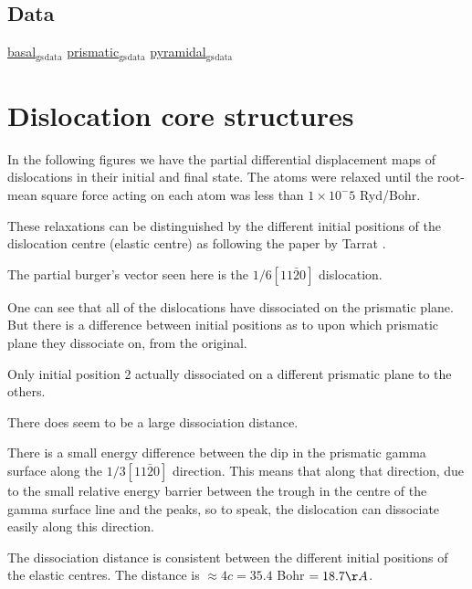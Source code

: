 \documentclass[11pt]{article}
\begin{document}
\subsection{Data}
\label{sec:org357f1bd}
\href{file:///home/tigany/Documents/ti/final\_model\_2019-11-12/results\_2019-11-09\_muc/gamma\_surfaces/basal/basal\_gs\_noo\_alat\_energies.dat}{basal\(_{\text{gs}}\)\(_{\text{data}}\)}
\href{file:///home/tigany/Documents/ti/final\_model\_2019-11-12/results\_2019-11-09\_muc/gamma\_surfaces/prismatic/prismatic\_gs\_noo\_alat\_energies.dat}{prismatic\(_{\text{gs}}\)\(_{\text{data}}\)}
\href{file:///home/tigany/Documents/ti/final\_model\_2019-11-12/gamma\_surfaces/pyramidal\_results\_2019-11-13/pyramidal\_gamma\_surface\_2019-11-13.dat}{pyramidal\(_{\text{gs}}\)\(_{\text{data}}\)}
\section{Dislocation core structures}
\label{sec:orgd5dc364}
In the following figures we have the partial differential
displacement maps of dislocations in their initial and final
state. The atoms were relaxed until the root-mean square force
acting on each atom was less than \(1\times 10^-5\) Ryd/Bohr. 

These relaxations can be distinguished by the different initial
positions of the dislocation centre (elastic centre) as following
the paper by Tarrat \cite{Tarrat2009}.

The partial burger's vector seen here is the \(1/6 [11\bar{2}0]\)
dislocation.

One can see that all of the dislocations have dissociated on the
prismatic plane. But there is a difference between initial
positions as to upon which prismatic plane they dissociate on,
from the original. 

Only initial position 2 actually dissociated on a different
prismatic plane to the others. 


There does seem to be a large dissociation distance. 

There is a small energy difference between the dip in the
prismatic gamma surface along the \(1/3 [11\bar{2}0]\)
direction. This means that along that direction, due to the small
relative energy barrier between the trough in the centre of the
gamma surface line and the peaks, so to speak, the dislocation
can dissociate easily along this direction. 

The dissociation distance is consistent between the different
initial positions of the elastic centres. The distance is \(\approx4c =
    35.4\) Bohr \(= 18.7 \AA\).
\end{document}
